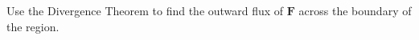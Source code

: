 \begin{mdframed}[ backgroundcolor=lightblue, linewidth=1pt, hidealllines=true]
\begin{ExerciseList}
Use the Divergence Theorem to find the outward flux of \( \mathbf{F} \) across the boundary of the region.






\end{ExerciseList}
\end{mdframed}
